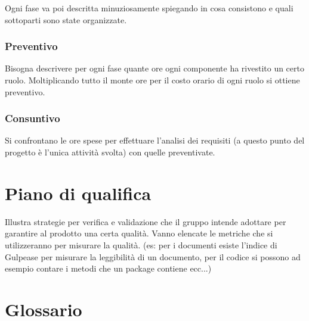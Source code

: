 \documentclass[a4paper]{article}
\begin{document}
Ogni fase va poi descritta minuziosamente spiegando in cosa consistono e quali sottoparti sono state organizzate. 

\subsubsection{Preventivo}
Bisogna descrivere per ogni fase quante ore ogni componente ha rivestito un certo ruolo. Moltiplicando tutto il monte ore per il costo orario di ogni ruolo si ottiene preventivo.

\subsubsection{Consuntivo}
Si confrontano le ore spese per effettuare l'analisi dei requisiti (a questo punto del progetto è l'unica attività svolta) con quelle preventivate.

\section{Piano di qualifica}
Illustra strategie per verifica e validazione che il gruppo intende adottare per garantire al prodotto una certa qualità.
Vanno elencate le metriche che si utilizzeranno per misurare la qualità. (es: per i documenti esiste l'indice di Gulpease per misurare la leggibilità di un documento, per il codice si possono ad esempio contare i metodi che un package contiene ecc...)

\section{Glossario}
\end{document}

